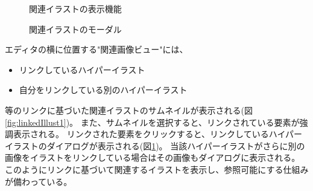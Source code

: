 \begin{figure}[htbp] \begin{minipage}{0.5\hsize}
                         \begin{center} 
                         \end{center} \caption{関連イラストの表示機能} \label{fig:linkedIllust1}
\end{minipage} \begin{minipage}{0.5\hsize}
                   \begin{center} 
                   \end{center} \caption{関連イラストのモーダル} \label{fig:linkedIllust2}
\end{minipage}
\end{figure}

エディタの横に位置する"関連画像ビュー"には、
\begin{itemize}
    \item リンクしているハイパーイラスト
    \item 自分をリンクしている別のハイパーイラスト
\end{itemize}等のリンクに基づいた関連イラストのサムネイルが表示される(図\ref{fig:linkedIllust1})。
また、サムネイルを選択すると、リンクされている要素が強調表示される。
リンクされた要素をクリックすると、リンクしているハイパーイラストのダイアログが表示される(図\ref{fig:linkedIllust2})。
当該ハイパーイラストがさらに別の画像をイラストをリンクしている場合はその画像もダイアログに表示される。
このようにリンクに基づいて関連するイラストを表示し、参照可能にする仕組みが備わっている。

